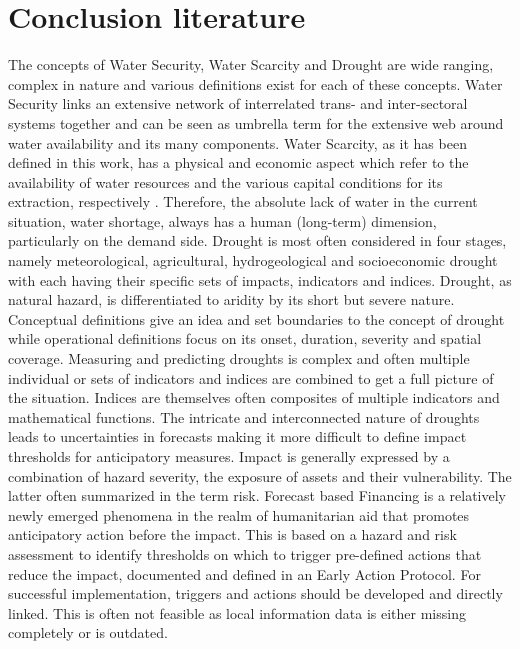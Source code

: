 


\section{Conclusion literature}

The concepts of Water Security, Water Scarcity and Drought are wide ranging, complex in nature and various definitions exist for each of these concepts. Water Security links an extensive network of interrelated trans- and inter-sectoral systems together and can be seen as umbrella term for the extensive web around water availability and its many components. Water Scarcity, as it has been defined in this work, has a physical and economic aspect which refer to the availability of water resources and the various capital conditions for its extraction, respectively \autocite{faoCopingWaterScarcity2012}. Therefore, the absolute lack of water in the current situation, water shortage, always has a human (long-term) dimension, particularly on the demand side. Drought is most often considered in four stages, namely meteorological, agricultural, hydrogeological and socioeconomic drought with each having their specific sets of impacts, indicators and indices. Drought, as natural hazard, is differentiated to aridity by its short but severe nature. Conceptual definitions give an idea and set boundaries to the concept of drought while operational definitions focus on its onset, duration, severity and spatial coverage.
Measuring and predicting droughts is complex and often multiple individual or sets of indicators and indices are combined to get a full picture of the situation. Indices are themselves often composites of multiple indicators and mathematical functions. The intricate and interconnected nature of droughts leads to uncertainties in forecasts making it more difficult to define impact thresholds for anticipatory measures. Impact is generally expressed by a combination of hazard severity, the exposure of assets and their vulnerability. The latter often summarized in the term risk.
Forecast based Financing is a relatively newly emerged phenomena in the realm of humanitarian aid that promotes anticipatory action before the impact. This is based on a hazard and risk assessment to identify thresholds on which to trigger pre-defined actions that reduce the impact, documented and defined in an Early Action Protocol. For successful implementation, triggers and actions should be developed and directly linked. This is often not feasible as local information data is either missing completely or is outdated.

